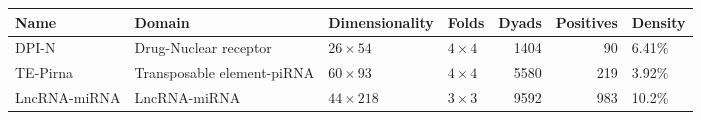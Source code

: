 \documentclass[sn-mathphys-num]{sn-jnl}%
\theoremstyle{thmstyleone}%
\theoremstyle{thmstyletwo}%
\theoremstyle{thmstylethree}%
\begin{document}
\begin{table}[ht]
\tiny
\begin{tabular}{llllrrl}
\toprule
Name & Domain & Dimensionality & Folds & Dyads & Positives & Density \\
\midrule
DPI-N & Drug-Nuclear receptor & $26 \times 54$ & $4 \times 4$ & 1404 & 90 & 6.41\% \\
TE-Pirna & Transposable element-piRNA & $60 \times 93$ & $4 \times 4$ & 5580 & 219 & 3.92\% \\
LncRNA-miRNA & LncRNA-miRNA & $44 \times 218$ & $3 \times 3$ & 9592 & 983 & 10.2\% \\

\end{tabular}
\end{table}
\end{document}
